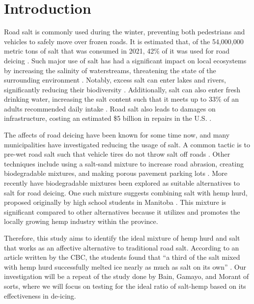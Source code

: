 \section*{Introduction}
Road salt is commonly used during the winter, preventing both pedestrians and vehicles to safely move over frozen roads.
It is estimated that, of the 54,000,000 metric tons of salt that was consumed in 2021, 42\% of it was used for road deicing \parencite{USG22}.
Such major use of salt has had a significant impact on local ecosystems by increasing the salinity of waterstreams, threatening the state of the surrounding environment \parencite{KGW20}.
Notably, excess salt can enter lakes and rivers, significantly reducing their biodiversity \parencite{HKM22}.
Additionally, salt can also enter fresh drinking water, increasing the salt content such that it meets up to 33\% of an adults recommended daily intake \parencite{CGR22}.
Road salt also leads to damages on infrastructure, costing an estimated \$5 billion in repairs in the U.S. \parencite{EPA20}.

The affects of road deicing have been known for some time now, and many municipalities have investigated reducing the usage of salt.
A common tactic is to pre-wet road salt such that vehicle tires do not throw salt off roads \parencites{ZAS20}{UFK17}.
Other techniques include using a salt-sand mixture to increase road abrasion, creating biodegradable mixtures, and making porous pavement parking lots \parencite{EPA20}.
More recently have biodegradable mixtures been explored as suitable alternatives to salt for road deicing.
One such mixture suggests combining salt with hemp hurd, proposed originally by high school students in Manitoba \parencite{KAV21}.
This mixture is significant compared to other alternatives because it utilizes and promotes the locally growing hemp industry within the province.

Therefore, this study aims to identify the ideal mixture of hemp hurd and salt that works as an affective alternative to traditional road salt.
According to an article written by the CBC, the students found that ``a third of the salt mixed with hemp hurd successfully melted ice nearly as much as salt on its own'' \parencite{KAV21}.
Our investigation will be a repeat of the study done by Bain, Gamayo, and Morant of sorts, where we will focus on testing for the ideal ratio of salt-hemp based on its effectiveness in de-icing.
